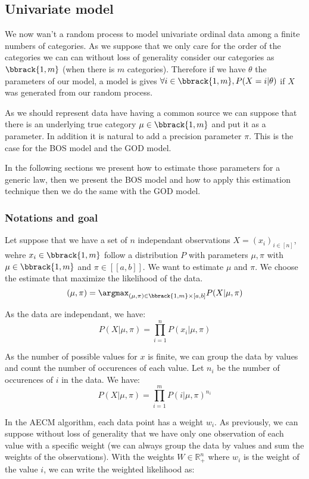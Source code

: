 \subsection{Univariate model}
\label{sec:univariate}

We now wan't a random process to model univariate ordinal data among a finite numbers of categories.
As we suppose that we only care for the order of the categories we can can without loss of generality consider our categories as $\bbrack{1, m}$ (when there is $m$ categories). Therefore if we have $\theta$ the parameters of our model, a model is gives $\forall i \in \bbrack{1, m}, P(X = i | \theta)$ if $X$ was generated from our random process. 

As we should represent data have having a common source we can suppose that there is an underlying true category $\mu \in \bbrack{1, m}$ and put it as a parameter. In addition it is natural to add a precision parameter $\pi$. This is the case for the BOS model and the GOD model. 

In the following sections we present how to estimate those parameters for a generic law, then we present the BOS model and how to apply this estimation technique then we do the same with the GOD model.


\subsubsection{Notations and goal}

Let suppose that we have a set of $n$ independant observations $X = (x_i)_{i \in [n]}$, wehre $x_i \in \bbrack{1, m}$ follow a distribution $P$ with parameters $\mu, \pi$ with $\mu \in \bbrack{1, m}$ and $\pi \in [[a, b]]$. We want to estimate $\mu$ and $\pi$. We choose the estimate that maximize the likelihood of the data.
$$(\mu, \pi) = \argmax_{(\mu, \pi) \in \bbrack{1, m} \times [a, b]} P(X | \mu, \pi)$$

As the data are independant, we have:
$$P(X | \mu, \pi) = \prod_{i=1}^n P(x_i | \mu, \pi)$$

As the number of possible values for $x$ is finite, we can group the data by values and count the number of occurences of each value. Let $n_i$ be the number of occurences of $i$ in the data. We have:
$$P(X | \mu, \pi) = \prod_{i=1}^m P(i | \mu, \pi)^{n_i}$$

In the AECM algorithm, each data point has a weight $w_i$. As previously, we can suppose without loss of generality that we have only one observation of each value with a specific weight (we can always group the data by values and sum the weights of the observations). With the weights $W \in \mathbb{R}_+^n$ where $w_i$ is the weight of the value $i$, we can write the weighted likelihood as:

